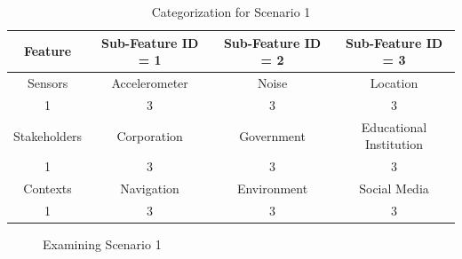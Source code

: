 \begin{table}[h!]
  \centering
  \caption{Categorization for Scenario 1}
  \label{tab:scenario11}
  \begin{tabular}{cccc}
    \toprule
    Feature & Sub-Feature ID = 1 & Sub-Feature ID = 2 & Sub-Feature ID = 3\\
    \midrule
    Sensors & Accelerometer & Noise & Location\\
     1 & 3 & 3 & 3\\ \hhline{====}
     Stakeholders & Corporation & Government & Educational Institution\\
     1 & 3 & 3 & 3\\ \hhline{====}
     Contexts & Navigation & Environment & Social Media\\
     1 & 3 & 3 & 3\\ 
    \bottomrule
  \end{tabular}
\end{table}
 
\begin{figure}[htp]
  \hspace{1em}
  \caption{Examining Scenario 1}
  \label{fig:scenatio11}
\end{figure}

%

